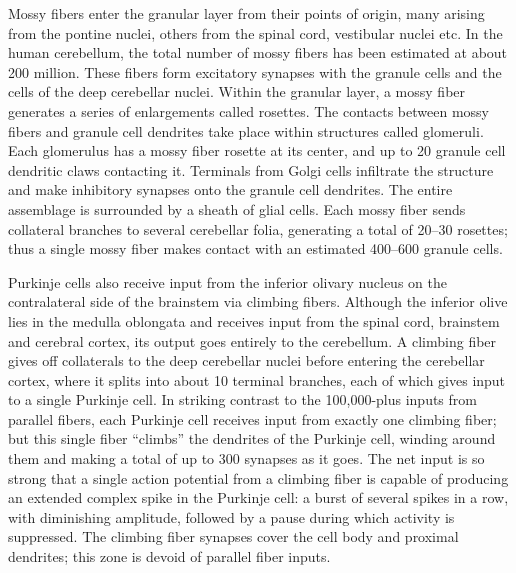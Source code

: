 \documentclass[]{book}
\begin{document}
Mossy fibers enter the granular layer from their points of origin, many arising from the pontine nuclei, others from the spinal cord, vestibular nuclei etc. In the human cerebellum, the total number of mossy fibers has been estimated at about 200 million. These fibers form excitatory synapses with the granule cells and the cells of the deep cerebellar nuclei. Within the granular layer, a mossy fiber generates a series of enlargements called rosettes. The contacts between mossy fibers and granule cell dendrites take place within structures called glomeruli. Each glomerulus has a mossy fiber rosette at its center, and up to 20 granule cell dendritic claws contacting it. Terminals from Golgi cells infiltrate the structure and make inhibitory synapses onto the granule cell dendrites. The entire assemblage is surrounded by a sheath of glial cells. Each mossy fiber sends collateral branches to several cerebellar folia, generating a total of 20--30 rosettes; thus a single mossy fiber makes contact with an estimated 400--600 granule cells.

Purkinje cells also receive input from the inferior olivary nucleus on the contralateral side of the brainstem via climbing fibers. Although the inferior olive lies in the medulla oblongata and receives input from the spinal cord, brainstem and cerebral cortex, its output goes entirely to the cerebellum. A climbing fiber gives off collaterals to the deep cerebellar nuclei before entering the cerebellar cortex, where it splits into about 10 terminal branches, each of which gives input to a single Purkinje cell. In striking contrast to the 100,000-plus inputs from parallel fibers, each Purkinje cell receives input from exactly one climbing fiber; but this single fiber ``climbs'' the dendrites of the Purkinje cell, winding around them and making a total of up to 300 synapses as it goes. The net input is so strong that a single action potential from a climbing fiber is capable of producing an extended complex spike in the Purkinje cell: a burst of several spikes in a row, with diminishing amplitude, followed by a pause during which activity is suppressed. The climbing fiber synapses cover the cell body and proximal dendrites; this zone is devoid of parallel fiber inputs.
\end{document}
